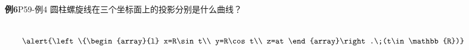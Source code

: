 \begin{frame}
	\linespread{1.2}
	\begin{exampleblock}{{\bf 例6}\hfill P59-例4}
		圆柱螺旋线在三个坐标面上的投影分别是什么曲线？
	\end{exampleblock}
	\pause
	\begin{columns}
			\begin{center}
			\end{center}\pause 
			$$\alert{\left\{\begin{array}{l}
					x=R\sin t\\ y=R\cos t\\ z=at
				\end{array}\right.\;(t\in\mathbb{R})}$$
	\end{columns}
\end{frame}

